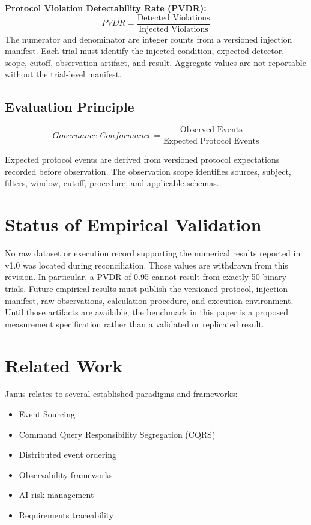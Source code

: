 \documentclass[conference]{IEEEtran}
\begin{document}
\medskip
\noindent\textbf{Protocol Violation Detectability Rate (PVDR):}
\begin{equation}
  PVDR = \frac{\text{Detected Violations}}{\text{Injected Violations}}
\end{equation}
The numerator and denominator are integer counts from a versioned injection
manifest. Each trial must identify the injected condition, expected detector,
scope, cutoff, observation artifact, and result. Aggregate values are not
reportable without the trial-level manifest.

\subsection{Evaluation Principle}

\begin{equation}
  \mathit{Governance\_Conformance} =
    \frac{\text{Observed Events}}{\text{Expected Protocol Events}}
\end{equation}

Expected protocol events are derived from versioned protocol expectations
recorded before observation. The observation scope identifies sources, subject,
filters, window, cutoff, procedure, and applicable schemas.

\section{Status of Empirical Validation}

No raw dataset or execution record supporting the numerical results reported in
v1.0 was located during reconciliation. Those values are withdrawn from this
revision. In particular, a PVDR of 0.95 cannot result from exactly 50 binary
trials. Future empirical results must publish the versioned protocol, injection
manifest, raw observations, calculation procedure, and execution environment.
Until those artifacts are available, the benchmark in this paper is a proposed
measurement specification rather than a validated or replicated result.

\section{Related Work}

Janus relates to several established paradigms and frameworks:

\begin{itemize}
    \item Event Sourcing~\cite{fowler}
    \item Command Query Responsibility Segregation (CQRS)~\cite{young}
    \item Distributed event ordering~\cite{lamport}
    \item Observability frameworks~\cite{otel}
    \item AI risk management~\cite{nist}
    \item Requirements traceability~\cite{gotel}
\end{itemize}
\end{document}

